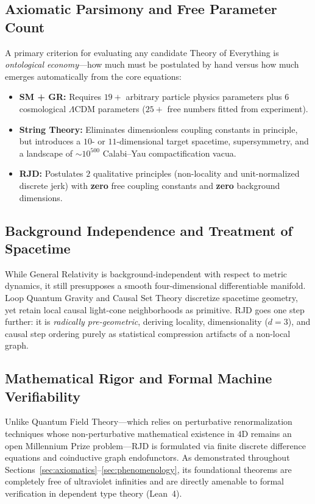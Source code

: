 \documentclass[11pt,a4paper]{article}
\theoremstyle{plain}
\theoremstyle{definition}
\theoremstyle{remark}
\begin{document}
\subsection{Axiomatic Parsimony and Free Parameter Count}
A primary criterion for evaluating any candidate Theory of Everything is \emph{ontological economy}—how much must be postulated by hand versus how much emerges automatically from the core equations:
\begin{itemize}
\item \textbf{SM + GR:} Requires $19+$ arbitrary particle physics parameters plus $6$ cosmological $\Lambda$CDM parameters ($25+$ free numbers fitted from experiment).
\item \textbf{String Theory:} Eliminates dimensionless coupling constants in principle, but introduces a $10$- or $11$-dimensional target spacetime, supersymmetry, and a landscape of $\sim 10^{500}$ Calabi--Yau compactification vacua.
\item \textbf{RJD:} Postulates $2$ qualitative principles (non-locality and unit-normalized discrete jerk) with \textbf{zero} free coupling constants and \textbf{zero} background dimensions.
\end{itemize}
\subsection{Background Independence and Treatment of Spacetime}
While General Relativity is background-independent with respect to metric dynamics, it still presupposes a smooth four-dimensional differentiable manifold. Loop Quantum Gravity and Causal Set Theory discretize spacetime geometry, yet retain local causal light-cone neighborhoods as primitive. RJD goes one step further: it is \emph{radically pre-geometric}, deriving locality, dimensionality ($d=3$), and causal step ordering purely as statistical compression artifacts of a non-local graph.
\subsection{Mathematical Rigor and Formal Machine Verifiability}
Unlike Quantum Field Theory—which relies on perturbative renormalization techniques whose non-perturbative mathematical existence in $4\text{D}$ remains an open Millennium Prize problem—RJD is formulated via finite discrete difference equations and coinductive graph endofunctors. As demonstrated throughout Sections~\ref{sec:axiomatics}--\ref{sec:phenomenology}, its foundational theorems are completely free of ultraviolet infinities and are directly amenable to formal verification in dependent type theory (Lean~4).
\end{document}

